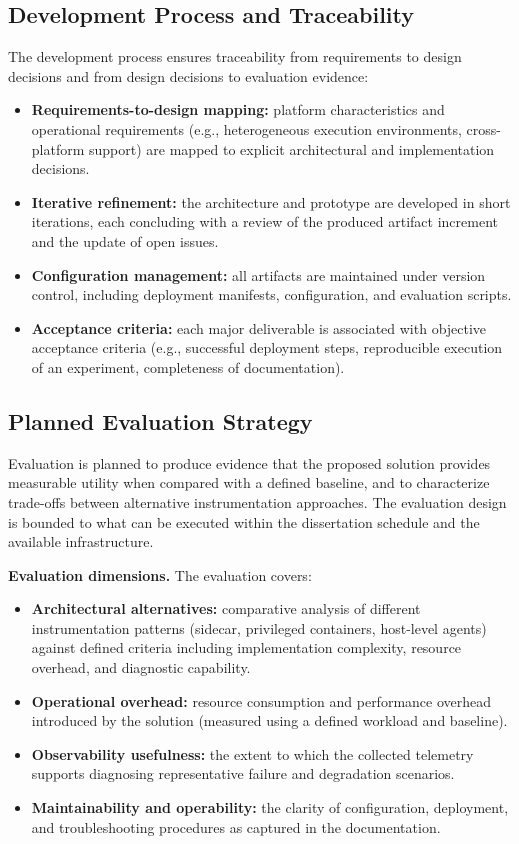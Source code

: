 \subsection{Development Process and Traceability}
\label{sec:ch3_process}

The development process ensures traceability from requirements to design decisions and from design decisions to evaluation evidence:
\begin{itemize}
    \item \textbf{Requirements-to-design mapping:} platform characteristics and operational requirements (e.g., heterogeneous execution environments, cross-platform support) are mapped to explicit architectural and implementation decisions.
    \item \textbf{Iterative refinement:} the architecture and prototype are developed in short iterations, each concluding with a review of the produced artifact increment and the update of open issues.
    \item \textbf{Configuration management:} all artifacts are maintained under version control, including deployment manifests, configuration, and evaluation scripts.
    \item \textbf{Acceptance criteria:} each major deliverable is associated with objective acceptance criteria (e.g., successful deployment steps, reproducible execution of an experiment, completeness of documentation).
\end{itemize}

\subsection{Planned Evaluation Strategy}
\label{sec:ch3_evaluation}

Evaluation is planned to produce evidence that the proposed solution provides measurable utility when compared with a defined baseline, and to characterize trade-offs between alternative instrumentation approaches. The evaluation design is bounded to what can be executed within the dissertation schedule and the available infrastructure.

		\textbf{Evaluation dimensions.} The evaluation covers:
\begin{itemize}
    \item \textbf{Architectural alternatives:} comparative analysis of different instrumentation patterns (sidecar, privileged containers, host-level agents) against defined criteria including implementation complexity, resource overhead, and diagnostic capability.
    \item \textbf{Operational overhead:} resource consumption and performance overhead introduced by the solution (measured using a defined workload and baseline).
    \item \textbf{Observability usefulness:} the extent to which the collected telemetry supports diagnosing representative failure and degradation scenarios.
    \item \textbf{Maintainability and operability:} the clarity of configuration, deployment, and troubleshooting procedures as captured in the documentation.
\end{itemize}

